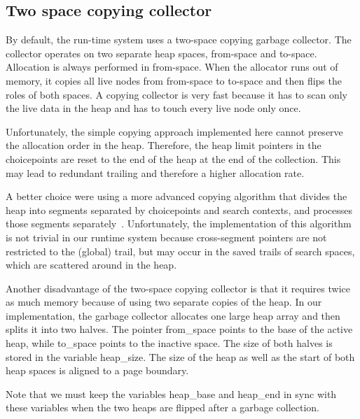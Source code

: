%
%
\subsection{Two space copying collector}
By default, the run-time system uses a two-space copying garbage
collector. The collector operates on two separate heap spaces,
from-space and to-space. Allocation is always performed in
from-space. When the allocator runs out of memory, it copies all live
nodes from from-space to to-space and then flips the roles of both
spaces. A copying collector is very fast because it has to scan only
the live data in the heap and has to touch every live node only once.

Unfortunately, the simple copying approach implemented here cannot
preserve the allocation order in the heap. Therefore, the heap limit
pointers in the choicepoints are reset to the end of the heap at the
end of the collection. This may lead to redundant trailing and
therefore a higher allocation rate.

A better choice were using a more advanced copying algorithm that
divides the heap into segments separated by choicepoints and search
contexts, and processes those segments
separately~\cite{DemoenEngelsTarau96:OrderPreserving}. Unfortunately,
the implementation of this algorithm is not trivial in our runtime
system because cross-segment pointers are not restricted to the
(global) trail, but may occur in the saved trails of search spaces,
which are scattered around in the heap.

Another disadvantage of the two-space copying collector is that it
requires twice as much memory because of using two separate copies of
the heap. In our implementation, the garbage collector allocates one
large heap array and then splits it into two halves. The pointer
{\Tt{}from{\_}space\nwendquote} points to the base of the active heap, while
{\Tt{}to{\_}space\nwendquote} points to the inactive space. The size of both halves is
stored in the variable {\Tt{}heap{\_}size\nwendquote}. The size of the heap as well as
the start of both heap spaces is aligned to a page boundary.

Note that we must keep the variables {\Tt{}heap{\_}base\nwendquote} and {\Tt{}heap{\_}end\nwendquote} in
sync with these variables when the two heaps are flipped after a
garbage collection.

